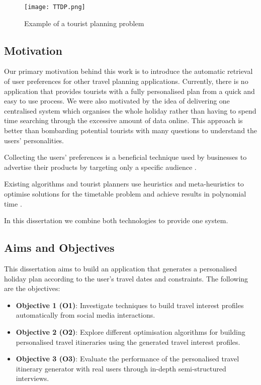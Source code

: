 \begin{figure}[h]
\centering
\texttt{[image: TTDP.png]}
\caption{Example of a tourist planning problem}
\label{TTDP}
\end{figure}

\subsection{Motivation}

Our primary motivation behind this work is to
introduce the automatic retrieval of user preferences
for other travel planning applications. Currently,
there is no application that provides
tourists with a fully personalised plan from a quick
and easy to use process.  We were also motivated
by the idea of delivering one centralised system which
organises the whole holiday rather than having to
spend time searching through the excessive amount of
data online. This approach is better than bombarding
potential tourists with many questions to understand
the users' personalities.

Collecting the users' preferences is a
beneficial technique used by businesses to advertise
their products by targeting only a specific audience
\cite{article}.

Existing algorithms and tourist planners use
heuristics and meta-heuristics to optimise solutions for the timetable
problem and achieve results in polynomial time
\cite{Vansteenwegen2011}.


In this dissertation we combine both
technologies to provide one system.

\subsection{Aims and Objectives}

This dissertation aims to build an application that
generates a personalised holiday plan according to the
user's travel dates and constraints. The following are the objectives:


\begin{itemize}
    \item \textbf{Objective 1 (O1)}: Investigate techniques to build travel interest
    profiles automatically from social media interactions.  
    \item \textbf{Objective 2 (O2)}: Explore different optimisation algorithms for
    building personalised travel itineraries using the
    generated travel interest profiles. 
    \item \textbf{Objective 3 (O3)}: Evaluate the
    performance of the personalised travel itinerary
    generator with real users through in-depth
    semi-structured interviews. 

\end{itemize}

